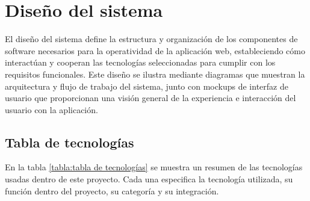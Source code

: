 \chapter{Diseño del sistema}\label{ch:diseño}
El diseño del sistema define la estructura y organización de los componentes de software necesarios para la operatividad de la aplicación web, estableciendo cómo interactúan y cooperan las tecnologías seleccionadas para cumplir con los requisitos funcionales. Este diseño se ilustra mediante diagramas que muestran la arquitectura y flujo de trabajo del sistema, junto con mockups de interfaz de usuario que proporcionan una visión general de la experiencia e interacción del usuario con la aplicación.

\section{Tabla de tecnologías}
En la tabla \ref{tabla:tabla de tecnologías} se muestra un resumen de las tecnologías usadas dentro de este proyecto. Cada una especifica la tecnología utilizada, su función dentro del proyecto, su categoría y su integración. 
